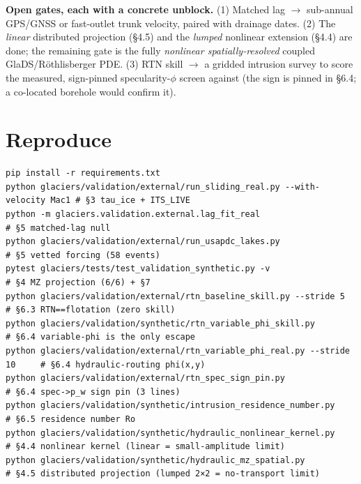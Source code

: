 \documentclass[tc, manuscript]{copernicus}
\begin{document}
\textbf{Open gates, each with a concrete unblock.} (1) Matched lag \ensuremath{\to} sub-annual GPS/GNSS or fast-outlet trunk velocity, paired with drainage dates. (2) The \emph{linear} distributed projection (§4.5) and the \emph{lumped} nonlinear extension (§4.4) are done; the remaining gate is the fully \emph{nonlinear spatially-resolved} coupled GlaDS/Röthlisberger PDE. (3) RTN skill \ensuremath{\to} a gridded intrusion survey to score the measured, sign-pinned specularity-$\phi $ screen against (the sign is pinned in §6.4; a co-located borehole would confirm it).

\section{Reproduce}

\begin{verbatim}
pip install -r requirements.txt
python glaciers/validation/external/run_sliding_real.py --with-velocity Mac1 # §3 tau_ice + ITS_LIVE
python -m glaciers.validation.external.lag_fit_real                          # §5 matched-lag null
python glaciers/validation/external/run_usapdc_lakes.py                      # §5 vetted forcing (58 events)
pytest glaciers/tests/test_validation_synthetic.py -v                        # §4 MZ projection (6/6) + §7
python glaciers/validation/external/rtn_baseline_skill.py --stride 5         # §6.3 RTN==flotation (zero skill)
python glaciers/validation/synthetic/rtn_variable_phi_skill.py               # §6.4 variable-phi is the only escape
python glaciers/validation/external/rtn_variable_phi_real.py --stride 10     # §6.4 hydraulic-routing phi(x,y)
python glaciers/validation/external/rtn_spec_sign_pin.py                     # §6.4 spec->p_w sign pin (3 lines)
python glaciers/validation/synthetic/intrusion_residence_number.py           # §6.5 residence number Ro
python glaciers/validation/synthetic/hydraulic_nonlinear_kernel.py            # §4.4 nonlinear kernel (linear = small-amplitude limit)
python glaciers/validation/synthetic/hydraulic_mz_spatial.py                  # §4.5 distributed projection (lumped 2×2 = no-transport limit)
\end{verbatim}
\end{document}
